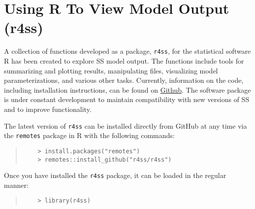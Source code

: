 
\section{Using R To View Model Output (r4ss)}\label{r4ss}

A collection of functions developed as a package, \texttt{r4ss}, for the statistical software R has been created to explore SS model output.  The functions include tools for summarizing and plotting results, manipulating files, visualizing model parameterizations, and various other tasks.  Currently, information on the code, including installation instructions, can be found on \href{https://github.com/r4ss/r4ss}{Github}.  The software package is under constant development to maintain compatibility with new versions of SS and to improve functionality.

The latest version of \texttt{r4ss} can be installed directly from GitHub at any time via the \texttt{remotes} package in R with the following commands:

\begin{quote}
	\begin{verbatim}
	> install.packages("remotes")
	> remotes::install_github("r4ss/r4ss")
	\end{verbatim}
\end{quote}




Once you have installed the \texttt{r4ss} package, it can be loaded in the regular manner:

\begin{quote}
	\begin{verbatim}
	> library(r4ss)
	\end{verbatim}
\end{quote}

